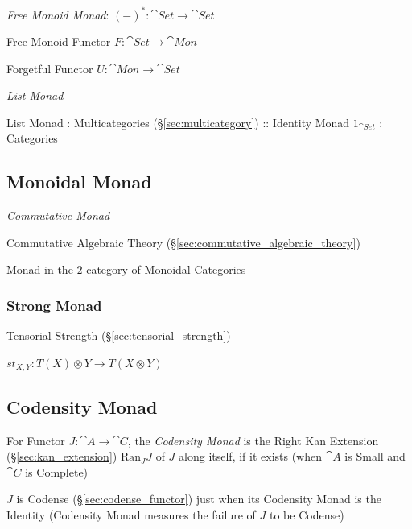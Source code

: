 \emph{Free Monoid Monad}: $(-)^* : \cat{Set} \rightarrow \cat{Set}$

Free Monoid Functor $F : \cat{Set} \rightarrow \cat{Mon}$

Forgetful Functor $U : \cat{Mon} \rightarrow \cat{Set}$

\emph{List Monad}

List Monad : Multicategories (\S\ref{sec:multicategory}) :: Identity
Monad $1_{\cat{Set}}$ : Categories



\subsection{Monoidal Monad}\label{sec:monoidal_monad}

\emph{Commutative Monad}

Commutative Algebraic Theory
(\S\ref{sec:commutative_algebraic_theory})

Monad in the $2$-category of Monoidal Categories




\subsubsection{Strong Monad}\label{sec:strong_monad}

Tensorial Strength (\S\ref{sec:tensorial_strength})

$st_{X,Y} : T(X) \otimes Y \rightarrow T(X \otimes Y)$



\subsection{Codensity Monad}\label{sec:codensity_monad}

For Functor $J : \cat{A} \rightarrow \cat{C}$, the \emph{Codensity Monad} is the
Right Kan Extension (\S\ref{sec:kan_extension}) $\mathrm{Ran}_J J$ of $J$ along
itself, if it exists (when $\cat{A}$ is Small and $\cat{C}$ is Complete)

$J$ is Codense (\S\ref{sec:codense_functor}) just when its Codensity Monad is
the Identity (Codensity Monad measures the failure of $J$ to be Codense)


